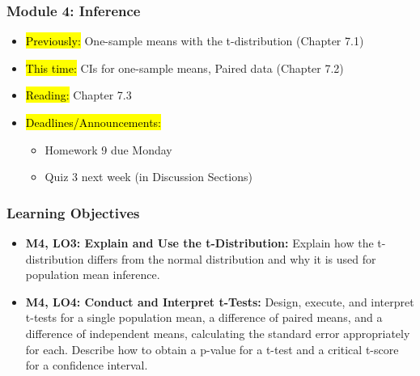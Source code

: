 
\begin{frame}
    \frametitle{Module 4: Inference}
    \begin{itemize}
        \item \hl{Previously: }One-sample means with the t-distribution (Chapter 7.1)
        \item \hl{This time: }CIs for one-sample means, Paired data (Chapter 7.2)
        \item \hl{Reading: }Chapter 7.3
        \item \hl{Deadlines/Announcements: }
        \begin{itemize}
            \item Homework 9 due Monday
            \item Quiz 3 next week (in Discussion Sections)
        \end{itemize}
    \end{itemize}

\end{frame}

\begin{frame}
    \frametitle{Learning Objectives}
    \begin{itemize}
        \item \textbf{M4, LO3: Explain and Use the t-Distribution:} Explain how the t-distribution differs from the normal distribution and why it is used for population mean inference.
        \item \textbf{M4, LO4: Conduct and Interpret t-Tests:} Design, execute, and interpret t-tests for a single population mean, a difference of paired means, and a difference of independent means, calculating the standard error appropriately for each. Describe how to obtain a p-value for a t-test and a critical t-score for a confidence interval.
    \end{itemize}
\end{frame}
